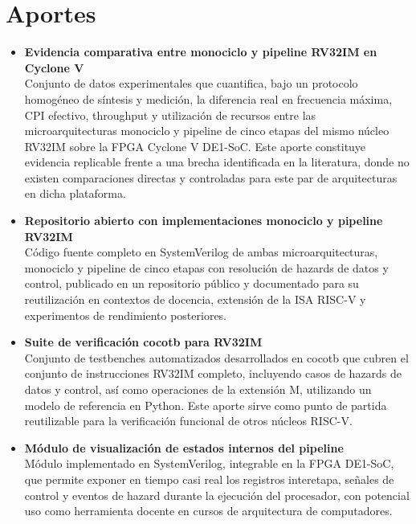 \section{Aportes}

\begin{itemize}
   \item \textbf{Evidencia comparativa entre monociclo y pipeline RV32IM en Cyclone V} \\
   Conjunto de datos experimentales que cuantifica, bajo un protocolo homogéneo de síntesis y medición, la diferencia real en frecuencia máxima, CPI efectivo, throughput y utilización de recursos entre las microarquitecturas monociclo y pipeline de cinco etapas del mismo núcleo RV32IM sobre la FPGA Cyclone V DE1-SoC. Este aporte constituye evidencia replicable frente a una brecha identificada en la literatura, donde no existen comparaciones directas y controladas para este par de arquitecturas en dicha plataforma.

   \item \textbf{Repositorio abierto con implementaciones monociclo y pipeline RV32IM} \\
   Código fuente completo en SystemVerilog de ambas microarquitecturas, monociclo y pipeline de cinco etapas con resolución de hazards de datos y control, publicado en un repositorio público y documentado para su reutilización en contextos de docencia, extensión de la ISA RISC-V y experimentos de rendimiento posteriores.

   \item \textbf{Suite de verificación cocotb para RV32IM} \\
   Conjunto de testbenches automatizados desarrollados en cocotb que cubren el conjunto de instrucciones RV32IM completo, incluyendo casos de hazards de datos y control, así como operaciones de la extensión M, utilizando un modelo de referencia en Python. Este aporte sirve como punto de partida reutilizable para la verificación funcional de otros núcleos RISC-V.

   \item \textbf{Módulo de visualización de estados internos del pipeline} \\
   Módulo implementado en SystemVerilog, integrable en la FPGA DE1-SoC, que permite exponer en tiempo casi real los registros interetapa, señales de control y eventos de hazard durante la ejecución del procesador, con potencial uso como herramienta docente en cursos de arquitectura de computadores.
\end{itemize}